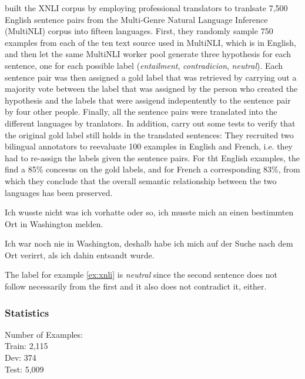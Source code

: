 \cite{conneau2018xnli} built the XNLI corpus by employing professional translators to tranlsate 7,500 English sentence pairs from the Multi-Genre Natural Language Inference (MultiNLI) corpus \cite{williams2017broad} into fifteen languages.
First, they randomly sample 750 examples from each of the ten text source used in MultiNLI, which is in English, and then let the same MultiNLI worker pool generate three hypothesis for each sentence, one for each possible label (\emph{entailment}, \emph{contradicion}, \emph{neutral}).
Each sentence pair was then assigned a gold label that was retrieved by carrying out a majority vote between the label that was assigned by the person who created the hypothesis and the labels that were assigend indepentently to the sentence pair by four other people.
Finally, all the sentence pairs were translated into the different languages by tranlators.
In addition, \cite{conneau2018xnli} carry out some tests to verify that the original gold label still holds in the translated sentences:
They recruited two bilingual annotators to reevaluate 100 examples in English and French, i.e. they had to re-assign the labels given the sentence pairs.
For tht English examples, the find a 85\% concesus on the gold labels, and for French a corresponding 83\%, from which they conclude that the overall semantic relationship between the two languages has been preserved.


\begin{examples}
	\label{ex:xnli}
	\item Ich wusste nicht was ich vorhatte oder so, ich musste mich an einen bestimmten Ort in Washington melden.

        Ich war noch nie in Washington, deshalb habe ich mich auf der Suche nach dem Ort verirrt, als ich dahin entsandt wurde.
\end{examples}

The label for example \ref{ex:xnli} is \emph{neutral} since the second sentence does not follow necessarily from the first and it also does not contradict it, either.

\subsubsection{Statistics}

Number of Examples: \\
Train: 2,115 \\
Dev: 374 \\
Test: 5,009

